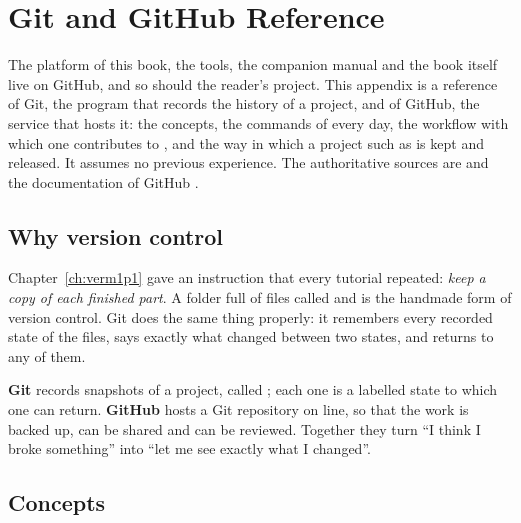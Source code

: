 \chapter{Git and GitHub Reference}
\label{app:github}

The platform of this book, the tools, the companion manual and the book
itself live on GitHub, and so should the reader's project. This appendix is a
reference of Git, the program that records the history of a project, and of
GitHub, the service that hosts it: the concepts, the commands of every day,
the workflow with which one contributes to \prg, and the way in which a
project such as \vermone is kept and released. It assumes no previous
experience. The authoritative sources are \citet{progit} and the
documentation of GitHub \citep{githubdocs}.

\section{Why version control}

Chapter~\ref{ch:verm1p1} gave an instruction that every tutorial repeated:
\emph{keep a copy of each finished part}. A folder full of files called
 and  is the
handmade form of version control. Git does the same thing properly: it
remembers every recorded state of the files, says exactly what changed
between two states, and returns to any of them.

\begin{prgconcept}
\textbf{Git} records snapshots of a project, called ; each one
is a labelled state to which one can return. \textbf{GitHub} hosts a Git
repository on line, so that the work is backed up, can be shared and can be
reviewed. Together they turn ``I think I broke something'' into ``let me see
exactly what I changed''.
\end{prgconcept}

\section{Concepts}

